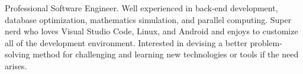 \begin{cvletter}

Professional Software Engineer. Well experienced in back-end development, database optimization, mathematics simulation, and parallel computing. Super nerd who loves Visual Studio Code, Linux, and Android and enjoys to customize all of the development environment. Interested in devising a better problem-solving method for challenging and learning new technologies or tools if the need arises.

\end{cvletter}